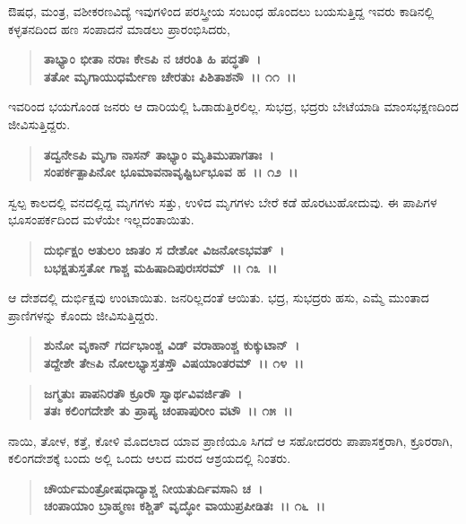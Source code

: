 ಔಷಧ, ಮಂತ್ರ, ವಶೀಕರಣವಿದ್ಯೆ ಇವುಗಳಿಂದ ಪರಸ್ತ್ರೀಯ ಸಂಬಂಧ ಹೊಂದಲು ಬಯಸುತ್ತಿದ್ದ ಇವರು ಕಾಡಿನಲ್ಲಿ ಕಳ್ಳತನದಿಂದ ಹಣ ಸಂಪಾದನೆ ಮಾಡಲು ಪ್ರಾರಂಭಿಸಿದರು,

\begin{verse}
\textbf{ತಾಭ್ಯಾಂ ಭೀತಾ ನರಾಃ ಕೇಽಪಿ ನ ಚರಂತಿ ಹಿ ಪದ್ಧತೌ~।}\\\textbf{ತತೋ ಮೃಗಾಯುಧರ್ಮೇಣ ಚೇರತುಃ ಪಿಶಿತಾಶನೌ~।। ೧೧~।।}
\end{verse}

ಇವರಿಂದ ಭಯಗೊಂಡ ಜನರು ಆ ದಾರಿಯಲ್ಲಿ ಓಡಾಡುತ್ತಿರಲಿಲ್ಲ. ಸುಭದ್ರ, ಭದ್ರರು ಬೇಟೆಯಾಡಿ ಮಾಂಸಭಕ್ಷಣದಿಂದ ಜೀವಿಸುತ್ತಿದ್ದರು.

\begin{verse}
\textbf{ತದ್ವನೇಽಪಿ ಮೃಗಾ ನಾಸನ್ ತಾಭ್ಯಾಂ ಮೃತಿಮುಪಾಗತಾಃ~।}\\\textbf{ಸಂಪರ್ಕತ್ಪಾಪಿನೋ ಭೂಮಾವನಾವೃಷ್ಟಿರ್ಬಭೂವ ಹ~।। ೧೨~।।}
\end{verse}

ಸ್ವಲ್ಪ ಕಾಲದಲ್ಲಿ ವನದಲ್ಲಿದ್ದ ಮೃಗಗಳು ಸತ್ತು, ಉಳಿದ ಮೃಗಗಳು ಬೇರೆ ಕಡೆ ಹೊರಟುಹೋದುವು. ಈ ಪಾಪಿಗಳ ಭೂಸಂಪರ್ಕದಿಂದ ಮಳೆಯೇ ಇಲ್ಲದಂತಾಯಿತು.

\begin{verse}
\textbf{ದುರ್ಭಿಕ್ಷಂ ಅತುಲಂ ಜಾತಂ ಸ ದೇಶೋ ವಿಜನೋಽಭವತ್~।}\\\textbf{ಬಭಕ್ಷತುಸ್ತತೋ ಗಾಶ್ಚ ಮಹಿಷಾದಿಪುರಃಸರಮ್~।। ೧೩~।।}
\end{verse}

ಆ ದೇಶದಲ್ಲಿ ದುರ್ಭಿಕ್ಷವು ಉಂಟಾಯಿತು. ಜನರಿಲ್ಲದಂತೆ ಆಯಿತು. ಭದ್ರ, ಸುಭದ್ರರು ಹಸು, ಎಮ್ಮೆ ಮುಂತಾದ ಪ್ರಾಣಿಗಳನ್ನು ಕೊಂದು ಜೀವಿಸುತ್ತಿದ್ದರು.

\begin{verse}
\textbf{ಶುನೋ ವೃಕಾನ್ ಗರ್ದಭಾಂಶ್ಚ ವಿಡ್ ವರಾಹಾಂಶ್ಚ ಕುಕ್ಕುಟಾನ್~।}\\\textbf{ತದ್ದೇಶೇ ತೇsಪಿ ನೋಲಭ್ಯಾಸ್ತತಸ್ತೌ ವಿಷಯಾಂತರಮ್~।। ೧೪~।। }
\end{verse}

\begin{verse}
\textbf{ಜಗ್ಮತುಃ ಪಾಪನಿರತೌ ಕ್ರೂರೌ ಸ್ವಾರ್ಥವಿವರ್ಜಿತೌ~।}\\\textbf{ತತಃ ಕಲಿಂಗದೇಶೇ ತು ಪ್ರಾಪ್ಯ ಚಂಪಾಪುರೀಂ ವಟೌ~।। ೧೫~।।}
\end{verse}

ನಾಯಿ, ತೋಳ, ಕತ್ತೆ, ಕೋಳಿ ಮೊದಲಾದ ಯಾವ ಪ್ರಾಣಿಯೂ ಸಿಗದೆ ಆ ಸಹೋದರರು ಪಾಪಾಸಕ್ತರಾಗಿ, ಕ್ರೂರರಾಗಿ, ಕಲಿಂಗದೇಶಕ್ಕೆ ಬಂದು ಅಲ್ಲಿ ಒಂದು ಆಲದ ಮರದ ಆಶ್ರಯದಲ್ಲಿ ನಿಂತರು.

\begin{verse}
\textbf{ಚೌರ್ಯಮಂತ್ರೋಷಧಾದ್ಯಾಶ್ಚ ನೀಯತುರ್ದಿವಸಾನಿ ಚ~।}\\\textbf{ಚಂಪಾಯಾಂ ಬ್ರಾಹ್ಮಣಃ ಕಶ್ಚಿತ್ ವೃದ್ಧೋ ವಾಯುಪ್ರಪೀಡಿತಃ~।। ೧೬~।।}
\end{verse}

